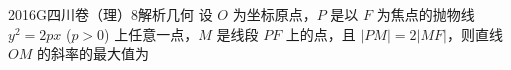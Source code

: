 
\begin{problem}{2016}{G}{四川卷（理）}{8}{解析几何}
设 $ O $ 为坐标原点，$ P $ 是以 $ F $ 为焦点的抛物线 $ y^2=2px $ ($ p>0 $) 上任意一点，$ M $ 是线段 $ PF $ 上的点，且 $ |PM|=2|MF| $，则直线 $ OM $ 的斜率的最大值为
\begin{choices}
\end{choices}
\end{problem}

\begin{answer}

\end{answer}

\begin{solutions}

\end{solutions}